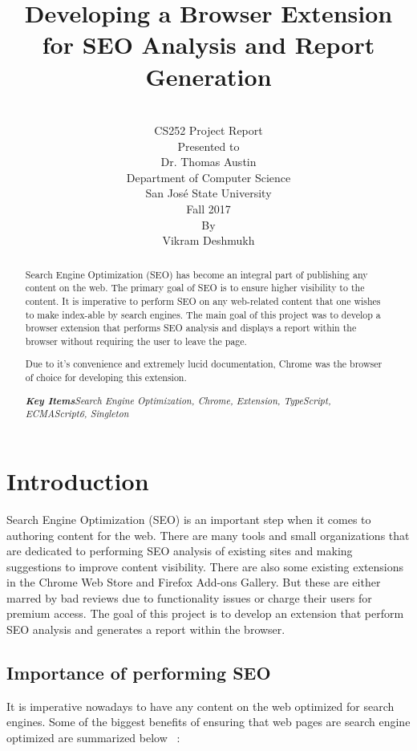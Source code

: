 \documentclass[14pt]{article}
\title{Developing a Browser Extension for SEO Analysis and Report Generation}
\author{
  \\[142pt]
  CS252 Project Report \\
  Presented to\\
  Dr. Thomas Austin\\
  Department of Computer Science \\
  San Jos\'{e} State University \\
  Fall 2017
  \bigskip
  \\[142pt]
  By\\
  Vikram Deshmukh \\
  }
\begin{document}
\bigskip


\maketitle
 
\pagebreak


\begin{abstract}
\normalsize{
Search Engine Optimization (SEO) has become an integral part of publishing any content on the web. The primary goal of SEO is to ensure higher visibility to the content. It is imperative to perform SEO on any web-related content that one wishes to make index-able by search engines. The main goal of this project was to develop a browser extension that performs SEO analysis and displays a report within the browser without requiring the user to leave the page.


Due to it's convenience and extremely lucid documentation, Chrome was the browser of choice for developing this extension.


\textit{\textbf{Key Items}\textemdash Search Engine Optimization, Chrome, Extension, TypeScript, ECMAScript6, Singleton}
}
\end{abstract}

\smallskip

\pagebreak
\tableofcontents
\pagebreak
\section{Introduction}
Search Engine Optimization (SEO) is an important step when it comes to authoring content for the web. There are many tools and small organizations that are dedicated to performing SEO analysis of existing sites and making suggestions to improve content visibility. There are also some existing extensions in the Chrome Web Store and Firefox Add-ons Gallery. But these are either marred by bad reviews due to functionality issues or charge their users for premium access. The goal of this project is to develop an extension that perform SEO analysis and generates a report within the browser.

\subsection{Importance of performing SEO}
It is imperative nowadays to have any content on the web optimized for search engines. Some of the biggest benefits of ensuring that web pages are search engine optimized are summarized below ~\cite{seo}:
\end{document}
